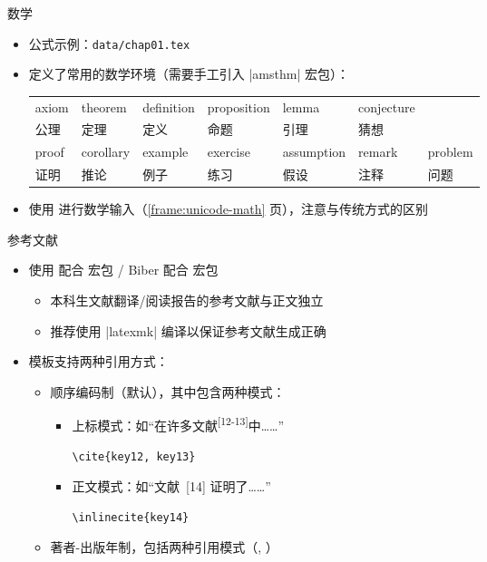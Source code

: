 \begin{frame}[fragile]{数学}
  \begin{itemize}
    \item 公式示例：\nolinkurl{data/chap01.tex}
    \item \ThuThesis{} 定义了常用的数学环境（需要手工引入 |amsthm| 宏包）：
      \begin{table}[h]
        \centering
        \footnotesize
\begin{tabular}{*{7}{l}}\toprule
  axiom & theorem & definition & proposition & lemma & conjecture &\\
  公理 & 定理 & 定义 & 命题 & 引理 & 猜想 &\\\midrule
  proof & corollary & example & exercise & assumption & remark & problem \\
  证明 & 推论 & 例子& 练习 & 假设 & 注释 & 问题\\\bottomrule
\end{tabular}
      \end{table}
      \item \ThuThesis{} 使用  进行数学输入（\ref{frame:unicode-math} 页），注意与传统方式的区别
  \end{itemize}
\end{frame}

\begin{frame}[fragile]{参考文献}
  \begin{itemize}
    \item 使用 \BibTeX 配合  宏包 / Biber 配合  宏包
      \begin{itemize}
        \item 本科生文献翻译/阅读报告的参考文献与正文独立
        \item 推荐使用 |latexmk| 编译以保证参考文献生成正确
      \end{itemize}
    \item 模板支持两种引用方式：
      \begin{itemize}
        \item 顺序编码制（默认），其中包含两种模式：
        \begin{itemize}
          \item 上标模式：如“在许多文献\textsuperscript{[12-13]}中……”
          \begin{lstlisting}[basicstyle=\ttfamily]
    \cite{key12, key13}
          \end{lstlisting}
        \item 正文模式：如“文献~[14] 证明了……”
          \begin{lstlisting}[basicstyle=\ttfamily]
    \inlinecite{key14}
          \end{lstlisting}
        \end{itemize}
        \item 著者-出版年制，包括两种引用模式（, ）
      \end{itemize}
    \end{itemize}
\end{frame}

